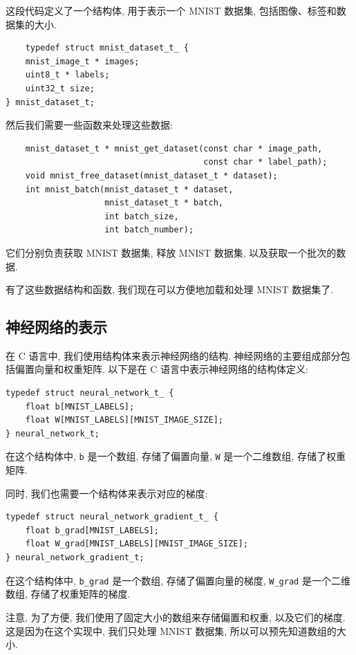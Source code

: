 \documentclass{ctexart}
\begin{document}
这段代码定义了一个结构体, 用于表示一个 MNIST 数据集, 包括图像、标签和数据集的大小.
\begin{verbatim}
    typedef struct mnist_dataset_t_ {  
    mnist_image_t * images;  
    uint8_t * labels;  
    uint32_t size;  
} mnist_dataset_t;  
\end{verbatim}

然后我们需要一些函数来处理这些数据:

\begin{verbatim}
    mnist_dataset_t * mnist_get_dataset(const char * image_path, 
                                        const char * label_path);  
    void mnist_free_dataset(mnist_dataset_t * dataset);  
    int mnist_batch(mnist_dataset_t * dataset, 
                    mnist_dataset_t * batch, 
                    int batch_size, 
                    int batch_number);  
\end{verbatim}

它们分别负责获取 MNIST 数据集, 释放 MNIST 数据集, 以及获取一个批次的数据.

有了这些数据结构和函数, 我们现在可以方便地加载和处理 MNIST 数据集了.

\subsection{神经网络的表示}

在 C 语言中, 我们使用结构体来表示神经网络的结构. 神经网络的主要组成部分包括偏置向量和权重矩阵. 以下是在 C 语言中表示神经网络的结构体定义:

\begin{verbatim}  
typedef struct neural_network_t_ {  
    float b[MNIST_LABELS];  
    float W[MNIST_LABELS][MNIST_IMAGE_SIZE];  
} neural_network_t;  
\end{verbatim}

在这个结构体中, \verb|b| 是一个数组, 存储了偏置向量, \verb|W| 是一个二维数组, 存储了权重矩阵.

同时, 我们也需要一个结构体来表示对应的梯度:

\begin{verbatim}  
typedef struct neural_network_gradient_t_ {  
    float b_grad[MNIST_LABELS];  
    float W_grad[MNIST_LABELS][MNIST_IMAGE_SIZE];  
} neural_network_gradient_t;  
\end{verbatim}

在这个结构体中, \verb|b_grad| 是一个数组, 存储了偏置向量的梯度, \verb|W_grad| 是一个二维数组, 存储了权重矩阵的梯度.

注意, 为了方便, 我们使用了固定大小的数组来存储偏置和权重, 以及它们的梯度. 这是因为在这个实现中, 我们只处理 MNIST 数据集, 所以可以预先知道数组的大小.
\end{document}
